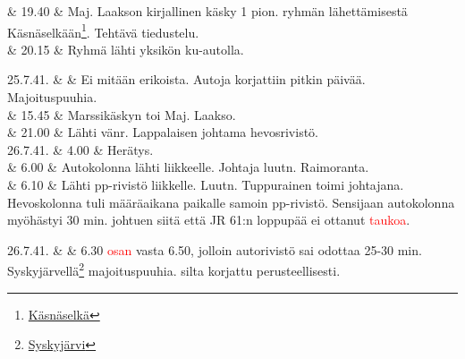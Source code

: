 \documentclass[11pt,a5paper,oneside]{book}
\begin{document}
& 19.40 & Maj. Laakson kirjallinen käsky 1 pion. ryhmän lähettämisestä Käsnäselkään\footnote{\href{https://www.google.fi/maps/place/Derevnya+Kyasnyasel'kya,+Republic+of+Karelia,+Russia,+186148/}{Käsnäselkä}}. Tehtävä tiedustelu. \\

& 20.15 & Ryhmä lähti yksikön ku-autolla. \\
\newpage

25.7.41. & & Ei mitään erikoista. Autoja korjattiin pitkin päivää. \newline Majoituspuuhia. \newline \\

& 15.45 & Marssikäskyn toi Maj. Laakso. \\

& 21.00 & Lähti vänr. Lappalaisen johtama hevosrivistö. \newline\newline\newline\newline\newline\newline\newline \\

26.7.41. & 4.00 & Herätys. \\

& 6.00 & Autokolonna lähti liikkeelle. Johtaja luutn. Raimoranta. \\

& 6.10 & Lähti pp-rivistö liikkelle. Luutn. Tuppurainen toimi johtajana. Hevoskolonna tuli määräaikana paikalle samoin pp-rivistö. Sensijaan autokolonna myöhästyi 30 min. johtuen siitä että JR 61:n loppupää ei ottanut \textcolor{red}{taukoa}. \\

\taulustop


26.7.41. & & 6.30 \textcolor{red}{osan} vasta 6.50, jolloin autorivistö sai odottaa 25-30 min. \newline\newline Syskyjärvellä\footnote{\href{https://www.google.fi/maps/place/Ozero+Syuskyuyarvi/}{Syskyjärvi}} majoituspuuhia.  silta korjattu perusteellisesti. \newline\newline\newline\newline\newline\newline \\
\end{document}
